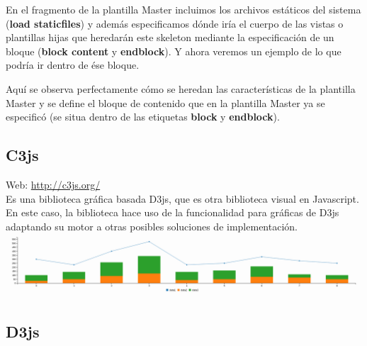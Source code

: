 

En el fragmento de la plantilla Master incluimos los archivos estáticos del sistema (\textbf{load staticfiles}) y además especificamos dónde iría el cuerpo de las vistas o plantillas hijas que heredarán este skeleton mediante la especificación de un bloque (\textbf{block content} y \textbf{endblock}). Y ahora veremos un ejemplo de lo que podría ir dentro de ése bloque.\\

\newpage
\begin{minipage}{\linewidth}
  
  Aquí se observa perfectamente cómo se heredan las características de la plantilla Master y se define el bloque de contenido que en la plantilla Master ya se especificó (se situa dentro de las etiquetas \textbf{block} y \textbf{endblock}). \\
\end{minipage}

\subsection{C3js}

Web: \url{http://c3js.org/}\\

Es una biblioteca gráfica basada D3js, que es otra biblioteca visual en Javascript. En este caso, la biblioteca hace uso de la funcionalidad para gráficas de D3js adaptando su motor a otras posibles soluciones de implementación.\\

\includegraphics[scale=0.25]{diagramas/c3js-chart.png}

\subsection{D3js}

